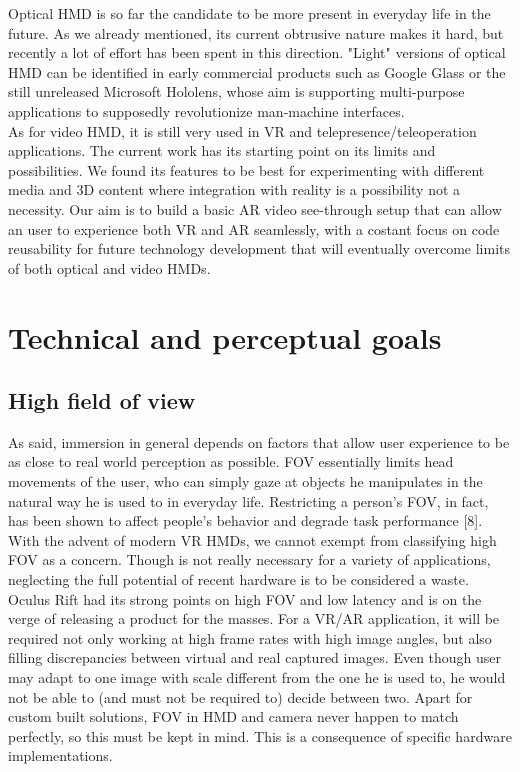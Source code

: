 Optical HMD is so far the candidate to be more present in everyday life in the future. As we already mentioned, its current obtrusive nature makes it hard, but recently a lot of effort has been spent in this direction. "Light" versions of optical HMD can be identified in early commercial products such as Google Glass or the still unreleased Microsoft Hololens, whose aim is supporting multi-purpose applications to supposedly revolutionize man-machine interfaces.\\
As for video HMD, it is still very used in VR and telepresence/teleoperation applications. The current work has its starting point on its limits and possibilities. We found its features to be best for experimenting with different media and 3D content where integration with reality is a possibility not a necessity. Our aim is to build a basic AR video see-through setup that can allow an user to experience both VR and AR seamlessly, with a costant focus on code reusability for future technology development that will eventually overcome limits of both optical and video HMDs.

\section{Technical and perceptual goals}
\subsection{High field of view}
As said, immersion in general depends on factors that allow user experience to be as close to real world perception as possible. FOV essentially limits head movements of the user, who can simply gaze at objects he manipulates in the natural way he is used to in everyday life. Restricting a person’s FOV, in fact, has been shown to affect people’s behavior and degrade task performance [8]. With the advent of modern VR HMDs, we cannot exempt from classifying high FOV as a concern. Though is not really necessary for a variety of applications, neglecting the full potential of recent hardware is to be considered a waste. Oculus Rift had its strong points on high FOV and low latency and is on the verge of releasing a product for the masses. For a VR/AR application, it will be required not only working at high frame rates with high image angles, but also filling discrepancies between virtual and real captured images. Even though user may adapt to one image with scale different from the one he is used to, he would not be able to (and must not be required to) decide between two. Apart for custom built solutions, FOV in HMD and camera never happen to match perfectly, so this must be kept in mind. This is a consequence of specific hardware implementations.

